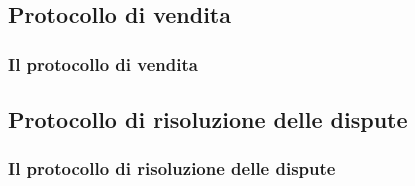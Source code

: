 \subsection{Protocollo di vendita}
\begin{frame}
\frametitle{Il protocollo di vendita}
\begin{overprint}
   \begin{center}\end{center}
    \begin{center}\end{center}
    \begin{center}\end{center}
    \begin{center}\end{center}
    \begin{center}\end{center}
    \begin{center}\end{center}
\end{overprint}    
\end{frame}

\subsection{Protocollo di risoluzione delle dispute}
\begin{frame}
\frametitle{Il protocollo di risoluzione delle dispute}
\begin{overprint}
   \begin{center}\end{center}
    \begin{center}\end{center}
    \begin{center}\end{center}
    \begin{center}\end{center}
    \begin{center}\end{center}
\end{overprint}    
\end{frame}
